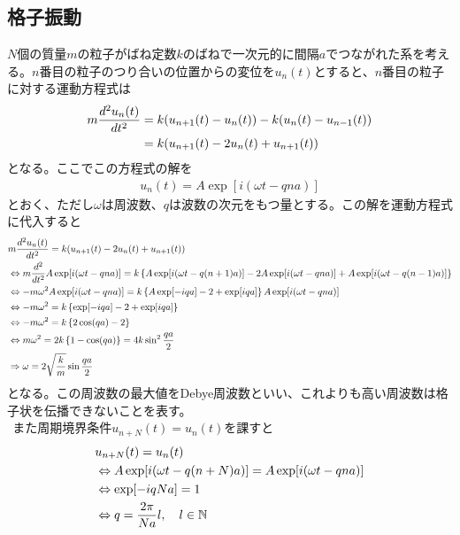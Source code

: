 \documentclass[dvipdfmx, 11pt, a4paper]{jsarticle}
\numberwithin{equation}{section}
\theoremstyle{definition}
\begin{document}
\subsection{格子振動}
    $N$個の質量$m$の粒子がばね定数$k$のばねで一次元的に間隔$a$でつながれた系を考える。$n$番目の粒子のつり合いの位置からの変位を$u_n(t)$とすると、$n$番目の粒子に対する運動方程式は
    \begin{align}
        m\frac{d^2u_n(t)}{dt^2} &= k(u_{n+1}(t) - u_n(t)) - k(u_n(t) - u_{n-1}(t)) \notag \\
        &= k(u_{n+1}(t) - 2u_n(t) + u_{n+1}(t))
    \end{align}
    となる。ここでこの方程式の解を
    \begin{align}
        u_n(t) = A \exp[i(\omega t - qna)]
    \end{align}
    とおく、ただし$\omega$は周波数、$q$は波数の次元をもつ量とする。この解を運動方程式に代入すると
    \begin{align}
        &m\frac{d^2u_n(t)}{dt^2} = k(u_{n+1}(t) - 2u_n(t) + u_{n+1}(t)) \notag \\
        &\Leftrightarrow m\frac{d^2}{dt^2} A \exp[i(\omega t - qna)] = k\left\{ A \exp[i(\omega t - q(n+1)a)] -2A \exp[i(\omega t - qna)] + A \exp[i(\omega t - q(n-1)a)] \right\} \notag \\
        &\Leftrightarrow -m\omega^2 A \exp[i(\omega t - qna)] = k\left\{ A \exp[-i qa] -2 +  \exp[i qa] \right\}A\exp[i(\omega t - qna)] \notag \\
        &\Leftrightarrow -m\omega^2 = k\left\{ \exp[-i qa] -2 + \exp[i qa] \right\} \notag \\
        &\Leftrightarrow -m\omega^2 = k\left\{ 2\cos(qa)-2 \right\} \notag \\
        &\Leftrightarrow m\omega^2 = 2k\left\{1 -  \cos (qa) \right\} = 4k\sin^2 \frac{qa}{2} \notag \\
        &\Rightarrow \omega = 2\sqrt{\frac{k}{m}} \sin \frac{qa}{2}
    \end{align}
    となる。この周波数の最大値をDebye周波数といい、これよりも高い周波数は格子状を伝播できないことを表す。\\
    $\ \ $また周期境界条件$u_{n+N}(t)=u_n(t)$を課すと
    \begin{align}
        &u_{n+N}(t)=u_n(t) \notag \\
        &\Leftrightarrow A \exp[i(\omega t - q(n+N)a)] = A \exp[i(\omega t - qna)] \notag \\
        &\Leftrightarrow \exp[-iqNa] = 1 \notag \\
        &\Leftrightarrow q = \frac{2\pi}{Na} l,\quad l \in \mathbb{N}    
    \end{align}
\end{document}
